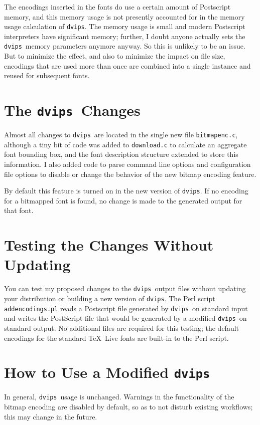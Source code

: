\documentclass{ltugboat}
\def\dvips{\texttt{dvips}}
\begin{document}
The encodings inserted in the fonts do use a certain amount of
Postscript memory, and this memory usage is not presently
accounted for in the memory usage calculation of \dvips.
The memory usage is small and modern Postscript interpreters
have significant memory; further, I doubt anyone actually sets
the \dvips\ memory parameters anymore anyway.  So this is unlikely
to be an issue.  But to minimize the effect, and also to
minimize the impact on file size, encodings that are used more
than once are combined into a single instance and reused for
subsequent fonts.

\section{The \dvips\ Changes}

Almost all changes to \dvips\ are located in the single new
file \texttt{bitmapenc.c}, although a tiny bit of code was
added to \texttt{download.c} to calculate an aggregate font
bounding box, and the font description structure extended to
store this information.  I also added code to parse command
line options and configuration file options to disable or
change the behavior of the new bitmap encoding feature.

By default this feature is turned on in the new version of
\dvips.  If no encoding for a bitmapped font is found, no
change is made to the generated output for that font.

\section{Testing the Changes Without Updating}

You can test my proposed changes to the \dvips\ output
files without updating your distribution or building a new
version of \dvips.  The Perl script
\texttt{addencodings.pl}\cite{T3S}
reads a Postscript file generated by \dvips\ on
standard input and writes the PostScript file that would be
generated by a modified \dvips\ on standard output.  No
additional files are required for this testing; the default
encodings for the standard \TeX\ Live fonts are built-in to
the Perl script.

\section{How to Use a Modified \dvips}

In general, \dvips\ usage is unchanged.  Warnings in
the functionality of the bitmap encoding are disabled by default,
so as to not disturb existing workflows; this may
change in the future.
\end{document}

